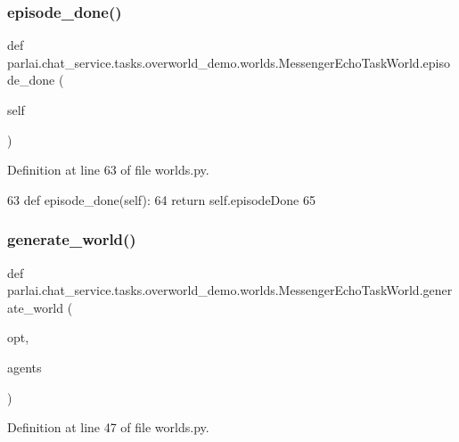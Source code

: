 \subsubsection{\texorpdfstring{episode\+\_\+done()}{episode\_done()}}
{\footnotesize\ttfamily def parlai.\+chat\+\_\+service.\+tasks.\+overworld\+\_\+demo.\+worlds.\+Messenger\+Echo\+Task\+World.\+episode\+\_\+done (\begin{DoxyParamCaption}\item[{}]{self }\end{DoxyParamCaption})}



Definition at line 63 of file worlds.\+py.


\begin{DoxyCode}
63     \textcolor{keyword}{def }episode\_done(self):
64         \textcolor{keywordflow}{return} self.episodeDone
65 
\end{DoxyCode}
\mbox{\label{classparlai_1_1chat__service_1_1tasks_1_1overworld__demo_1_1worlds_1_1MessengerEchoTaskWorld_a75b6e3fbde6e2aac97a40af2741d2d68}} 
\subsubsection{\texorpdfstring{generate\+\_\+world()}{generate\_world()}}
{\footnotesize\ttfamily def parlai.\+chat\+\_\+service.\+tasks.\+overworld\+\_\+demo.\+worlds.\+Messenger\+Echo\+Task\+World.\+generate\+\_\+world (\begin{DoxyParamCaption}\item[{}]{opt,  }\item[{}]{agents }\end{DoxyParamCaption})\hspace{0.3cm}{\ttfamily [static]}}



Definition at line 47 of file worlds.\+py.


